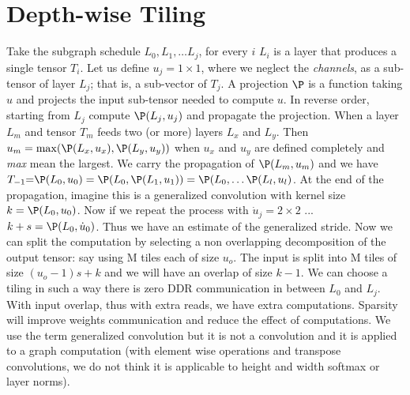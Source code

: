 \documentclass{IEEEtran}
\begin{document}
\section{Depth-wise Tiling}
Take the subgraph schedule $L_0, L_1, \dots L_j$, for every $i$ $L_i$
is a layer that produces a single tensor $T_i$. Let us define
$u_j=1\times1$, where we neglect the {\em channels}, as a sub-tensor
of layer $L_j$; that is, a sub-vector of $T_j$. A projection $\P$ is a
function taking $u$ and projects the input sub-tensor needed to
compute $u$.  In reverse order, starting from $L_j$ compute
$\P(L_j,u_j)$ and propagate the projection. When a layer $L_m$ and
tensor $T_m$ feeds two (or more) layers $L_x$ and $L_y$. Then $u_m =
\max ( \P(L_x,u_x),\P(L_y,u_y))$ when $u_x$ and $u_y$ are defined
completely and {\em max} mean the largest. We carry the propagation of
$\P(L_m,u_m)$ and we have $T_{-1} \eq \P(L_0, u_0) = \P(L_0, \P(L_1,
u_1))= \P(L_0, \dots \P(L_l, u_l)$. At the end of the propagation,
imagine this is a generalized convolution with kernel size $k =
\P(L_0, u_0)$. Now if we repeat the process with $\dot{u}_j = 2\times
2$ ... $k+s = \P(L_0, \dot{u}_0)$. Thus we have an estimate of the
generalized stride.  Now we can split the computation by selecting a
non overlapping decomposition of the output tensor: say using M tiles
each of size $u_o$. The input is split into M tiles of size
$(u_o-1)s+k$ and we will have an overlap of size $k-1$. We can choose
a tiling in such a way there is zero DDR communication in between
$L_0$ and $L_j$.  With input overlap, thus with extra reads, we have
extra computations. Sparsity will improve weights communication and
reduce the effect of computations. We use the term generalized
convolution but it is not a convolution and it is applied to a graph
computation (with element wise operations and transpose convolutions,
we do not think it is applicable to height and width softmax or layer
norms).


\end{document}
